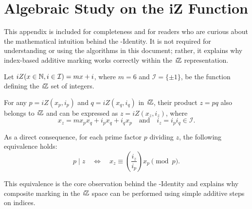 \documentclass{article}
\begin{document}
\newpage

\section{Algebraic Study on the iZ Function} \label{appendix:iz_lemma}

This appendix is included for completeness and for readers who are curious about the mathematical intuition behind the \Xp-Identity. It is not required for understanding or using the algorithms in this document; rather, it explains why index-based additive marking works correctly within the $\textit{i}\mathbb{Z}$ representation.

\medskip
\begin{lemma}
    \label{lem:iZ}
    Let $iZ(x \in \mathbb{N}, i \in \mathcal{I}) = mx + i$, where $m = 6$ and $\mathcal{I} = \{\pm 1\}$, be the function defining the $\textit{i}\mathbb{Z}$ set of integers.

    For any $p=iZ(x_p,i_p)$ and $q=iZ(x_q,i_q)$ in $\textit{i}\mathbb{Z}$, their product $z = pq$ also belongs to $\textit{i}\mathbb{Z}$ and can be expressed as $z = iZ(x_z, i_z)$, where
    \[
    x_z = m x_p x_q + i_p x_q + i_q x_p
    \quad\text{and}\quad
    i_z = i_p i_q \in \mathcal{I}.
    \]

    As a direct consequence, for each prime factor $p$ dividing $z$, the following equivalence holds:
    \begin{equation}
        p \mid z \quad \Longleftrightarrow \quad x_z \equiv (\frac{i_z}{i_p}) x_p \pmod{p}.
    \end{equation}
\end{lemma}

This equivalence is the core observation behind the \Xp-Identity and explains why composite marking in the $\textit{i}\mathbb{Z}$ space can be performed using simple additive steps on indices.
\end{document}
